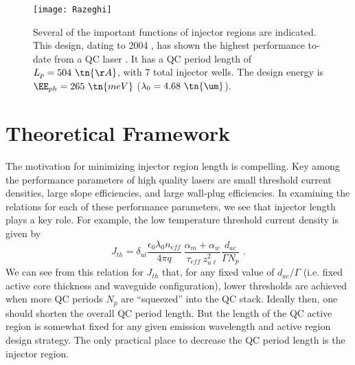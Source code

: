 \begin{figure}[tp]
\centering
\texttt{[image: Razeghi]}
\caption[Conventional QC laser structure]{  Several of the important functions of injector regions are indicated.  This design, dating to 2004 \cite{Evans:APL:2004}, has shown the highest performance to-date from a QC laser \cite{Razeghi:SPIE:2009}.  It has a QC period length of $L_p=504~\tn{\AA}$, with 7 total injector wells.  The design energy is $\EE_{ph}=265~\tn{meV}$ ($\lambda_0=4.68~\tn{\um}$).}
\label{chpt4:Razeghi}
\end{figure}


\section{Theoretical Framework}

The motivation for minimizing injector region length is compelling.  Key among the performance parameters of high quality lasers are small threshold current densities, large slope efficiencies, and large wall-plug efficiencies.  In examining the relations for each of these performance parameters, we see that injector length plays a key role.  For example, the low temperature threshold current density is given by
\begin{equation}
 J_{th} = \delta_{ul} \frac{\epsilon_0 \lambda_0 n_\textit{eff}}{4 \pi q} \: \frac{\alpha_m + \alpha_w}{\tau_{\textit{eff}} \: z_{u \ell}^2} \frac{d_{ac}}{\Gamma N_p} \text{~.}
\end{equation}
We can see from this relation for $J_{th}$ that, for any fixed value of $d_{ac}/\Gamma$ (i.e. fixed active core thickness and waveguide configuration), lower thresholds are achieved when more QC periods $N_p$ are ``squeezed'' into the QC stack.  Ideally then, one should shorten the overall QC period length.  But the length of the QC active region is somewhat fixed for any given emission wavelength and active region design strategy.  The only practical place to decrease the QC period length is the injector region.

